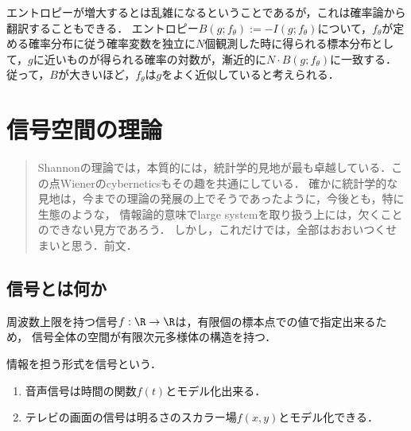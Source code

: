 \documentclass[uplatex,dvipdfmx]{jsreport}
\begin{document}
\begin{remarks}[Boltzmanのエントロピーの確率論的解釈]
    エントロピーが増大するとは乱雑になるということであるが，これは確率論から翻訳することもできる．
    エントロピー$B(g;f_\theta):=-I(g;f_\theta)$について，$f_\theta$が定める確率分布に従う確率変数を独立に$N$個観測した時に得られる標本分布として，$g$に近いものが得られる確率の対数が，漸近的に$N\cdot B(g;f_\theta)$に一致する\cite{Sanov61}．
    従って，$B$が大きいほど，$f_\theta$は$g$をよく近似していると考えられる．
\end{remarks}

\chapter{信号空間の理論}

\begin{quotation}
    Shannonの理論では，本質的には，統計学的見地が最も卓越している．この点Wienerのcyberneticsもその趣を共通にしている．
    確かに統計学的な見地は，今までの理論の発展の上でそうであったように，今後とも，特に生態のような，
    情報論的意味でlarge systemを取り扱う上には，欠くことのできない見方であろう．
    しかし，これだけでは，全部はおおいつくせまいと思う．\cite{甘利俊一68-情報科学講座}前文．
\end{quotation}

\section{信号とは何か}

\begin{tcolorbox}[colframe=ForestGreen, colback=ForestGreen!10!white,breakable,colbacktitle=ForestGreen!40!white,coltitle=black,fonttitle=\bfseries\sffamily,
title=]
    周波数上限を持つ信号$f:\R\to\R$は，有限個の標本点での値で指定出来るため，
    信号全体の空間が有限次元多様体の構造を持つ．
\end{tcolorbox}

情報を担う形式を信号という．

\begin{example}\mbox{}
    \begin{enumerate}
        \item 音声信号は時間の関数$f(t)$とモデル化出来る．
        \item テレビの画面の信号は明るさのスカラー場$f(x,y)$とモデル化できる．
    \end{enumerate}
\end{example}
\end{document}

